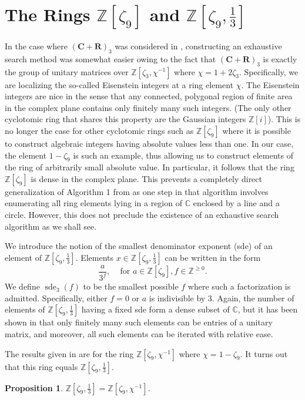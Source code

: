 \documentclass[12pt]{amsart}
\newtheorem{proposition}[theorem]{Proposition}
\theoremstyle{definition}
\newcommand{\Z}{\mathbb{Z}}
\newcommand{\C}{\mathbb{C}}
\newcommand{\CR}{(\mathbf{C} + \mathbf{R})_3}
\newcommand{\Znc}{\mathbb{Z}[\zeta_9,\chi^{-1}]}
\newcommand{\Znt}{\mathbb{Z}[\zeta_9,\frac{1}{3}]}
\DeclareMathOperator{\sde}{sde}
\begin{document}
	\section{The Rings $\mathbb{Z}[\zeta_9]$ and $\mathbb{Z}[\zeta_9, \frac{1}{3}]$}
	
	In the case where $\CR$ was considered in \cite{Gust}, constructing an exhaustive search method was somewhat easier owing to the fact that $\CR$ is exactly the group of unitary matrices over $\mathbb{Z}[\zeta_3,\chi^{-1}]$ where $\chi = 1 + 2\zeta_3$. Specifically, we are localizing the so-called Eisenstein integers at a ring element $\chi$. The Eisenstein integers are nice in the sense that any connected, polygonal region of finite area in the complex plane contains only finitely many such integers. (The only other cyclotomic ring that shares this property are the Gaussian integers $\Z[i]$). This is no longer the case for other cyclotomic rings such as $\Z[\zeta_9]$ where it is possible to construct algebraic integers having absolute values less than one. In our case, the element $1 - \zeta_9$ is such an example, thus allowing us to construct elements of the ring of arbitrarily small absolute value. In particular, it follows that the ring $\Z[\zeta_9]$ is dense in the complex plane. This prevents a completely direct generalization of Algorithm 1 from \cite{Gust} as one step in that algorithm involves enumerating all ring elements lying in a region of $\C$ enclosed by a line and a circle. However, this does not preclude the existence of an exhaustive search algorithm as we shall see.
	
	We introduce the notion of the smallest denominator exponent (sde) of an element of $\Znt$. Elements $x \in \Znt$ can be written in the form 
	$$
	\dfrac{a}{3^f}, \;\;\; \mbox{ for } a \in \Z[\zeta_9], f \in \Z^{\geq 0}.
	$$
	We define $\sde_3(f)$ to be the smallest possible $f$ where such a factorization is admitted. Specifically, either $f = 0$ or $a$ is indivisible by 3. Again, the number of elements of $\Znt$ having a fixed sde form a dense subset of $\C$, but it has been shown in \cite{Kal} that only finitely many such elements can be entries of a unitary matrix, and moreover, all such elements can be iterated with relative ease.
	
	The results given in \cite{Kal} are for the ring $\Znc$ where $\chi = 1 - \zeta_9$. It turns out that this ring equals $\Znt$.
	
	\begin{proposition}\label{P:2:1}
		$\Znt = \Znc$.
	\end{proposition}
\end{document}
